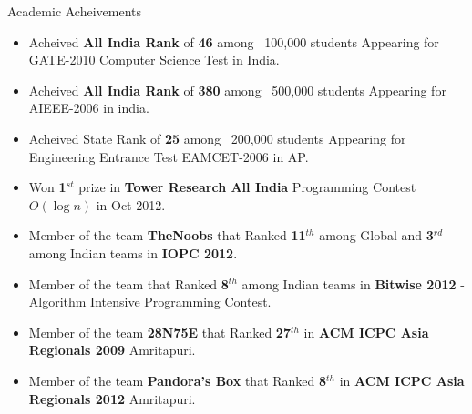 \documentclass[10pt]{article}
\newenvironment{ressection}[1]{
	\vspace{4pt}
	{\fontfamily{phv}\selectfont\Large#1}
	\begin{itemize}
	\vspace{3pt}
}{
	\end{itemize}
}
\newcommand{\resitem}[1]{
	\vspace{-4pt}
	\item \begin{flushleft} #1 \end{flushleft}
}
\begin{document}
\vspace{0.5cm}
\begin{ressection}{Academic Acheivements}

	\resitem{Acheived \textbf{All India Rank} of \textbf{46} among ~100,000 students Appearing for GATE-2010 Computer Science Test in India.}

	\resitem{Acheived \textbf{All India Rank} of \textbf{380} among ~500,000 students Appearing for AIEEE-2006 in india.}

	\resitem{Acheived State Rank of \textbf{25} among ~200,000 students Appearing for Engineering Entrance Test EAMCET-2006 in AP.}

  \resitem{Won \textbf{1$^{st}$} prize in \textbf{Tower Research All India} Programming Contest \textbf{$O(\log{n})$} in Oct 2012.}
  
  \resitem{Member of the team \textbf{TheNoobs} that Ranked \textbf{11$^{th}$} among Global and \textbf{3$^{rd}$} among Indian teams in \textbf{IOPC 2012}. }

  \resitem{Member of the team that Ranked \textbf{8$^{th}$} among Indian teams in \textbf{Bitwise 2012} - Algorithm Intensive Programming Contest.}
  
  \resitem{Member of the team \textbf{28N75E} that 
  Ranked \textbf{27$^{th}$} in \textbf{ACM ICPC Asia Regionals 2009} Amritapuri.}
  
  \resitem{Member of the team \textbf{Pandora's Box} that 
  Ranked \textbf{8$^{th}$} in \textbf{ACM ICPC Asia Regionals 2012} Amritapuri.}
  
\end{ressection}
\end{document}
